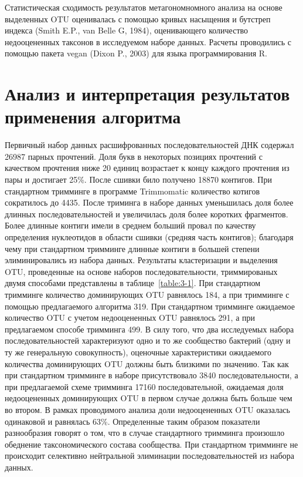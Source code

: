\documentclass[a4paper,12pt,openany,final]{extreport}
\begin{document}
Статистическая сходимость результатов метагономномного анализа на основе
выделенных OTU оценивалась с помощью кривых насыщения и бутстреп индекса
(Smith E.P., van Belle G, 1984), оценивающего количество недооцененных
таксонов в исследуемом наборе данных. Расчеты проводились с помощью
пакета vegan (Dixon P., 2003) для языка программирования R.

\section{Анализ и интерпретация результатов применения алгоритма}

Первичный набор данных
расшифрованных последовательностей ДНК содержал 26987 парных прочтений.
Доля букв в некоторых позициях прочтений с качеством прочтения ниже 20
единиц возрастает к концу каждого прочтения из пары и достигает 25\%.
После сшивки било получено 18870 контигов. При стандартном тримминге в
программе Trimmomatic количество котигов сократилось до 4435. После
триминга в наборе данных уменьшилась доля более длинных
последовательностей и увеличилась доля более коротких фрагментов. Более
длинные контиги имели в среднем больший провал по качеству определения
нуклеотидов в области сшивки (средняя часть контигов); благодаря чему
при стандартном тримминге длинные контиги в большей степени
элиминировались из набора данных. Результаты кластеризации и выделения
OTU, проведенные на основе наборов последовательности, триммированых
двумя способами представлены в таблице~\ref{table:3-1}. При стандартном тримминге
количество доминирующих OTU равнялось 184, а при тримминге с помощью
предлагаемого алгоритма 319. При стандартном тримминге ожидаемое
количество OTU с учетом недооцененных OTU равнялось 291, а при
предлагаемом способе тримминга 499. В силу того, что два исследуемых
набора последовательностей характеризуют одно и то же сообщество
бактерий (одну и ту же генеральную совокупность), оценочные
характеристики ожидаемого количества доминирующих OTU должны быть
близкими по значению. Так как при стандартном тримминге в наборе
присутствовало 3840 последовательности, а при предлагаемой схеме
тримминга 17160 последовательной, ожидаемая доля недооцененных
доминирующих OTU в первом случае должна быть больше чем во втором. В
рамках проводимого анализа доли недооцененных OTU оказалась одинаковой и
равнялась 63\%. Определенные таким образом показатели разнообразия
говорят о том, что в случае стандартного тримминга произошло обеднение
таксономического состава сообщества. При стандартном тримминге не
происходит селективно нейтральной элиминации последовательностей из
набора данных.
\end{document}
